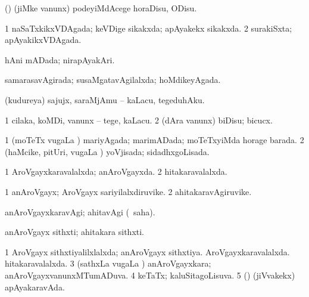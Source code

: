 \bentry
{} 
\gl{\sakirx}
\expl{}
\bmng
(\birx) (jiMke \mo vanunx) podeyiMdAcege horaDisu, ODisu. 
\emng
\eentry

\bentry
{} 
\gl{\gu}
\expl{}
\bmng
\bnum
\num{1} naSaTxkikxVDAgada; keVDige sikakxda; apAyakekx sikakxda. 
\num{2} surakiSxta; apAyakikxVDAgada. 
\enum
\emng
\eentry

\bentry
{} 
\gl{\gu}
\expl{}
\bmng
hAni mADada; nirapAyakAri. 
\emng
\eentry

\bentry
{} 
\gl{\gu}
\expl{}
\bmng
samarasavAgirada; susaMgatavAgilalxda; hoMdikeyAgada. 
\emng
\eentry

\bentry
{} 
\gl{\sakirx}
\expl{}
\bmng
(kudureya) sajujx, saraMjAmu -- kaLacu, tegeduhAku. 
\emng
\eentry

\bentry
{} 
\gl{\sakirx}
\expl{}
\bmng
\bnum
\num{1} cilaka, koMDi, \mo vanunx -- tege, kaLacu. 
\num{2} (dAra \mo vanunx) biDisu; bicucx. 
\enum
\emng
\eentry

\bentry
{} 
\gl{\gu}
\expl{}
\bmng
\bnum
\num{1} (moTeTx \mo vugaLa \vi) mariyAgada; marimADada; moTeTxyiMda horage barada. 
\num{2} (haMcike, pitUri, \mo vugaLa \vi) yoVjisada; sidadhxgoLisada. 
\enum
\emng
\eentry

\bentry
{} 
\gl{\gu}
\expl{}
\bmng
\bnum
\num{1} AroVgayxkaravalalxda; anAroVgayxda. 
\num{2} hitakaravalalxda. 
\enum
\emng
\eentry

\bentry
{} 
\gl{\nA}
\expl{}
\bmng
\bnum
\num{1} anAroVgayx; AroVgayx sariyilalxdiruvike. 
\num{2} ahitakaravAgiruvike. 
\enum
\emng
\eentry

\bentry
{} 
\gl{\kirxvi}
\expl{}
\bmng
anAroVgayxkaravAgi; ahitavAgi (\rUpa\ saha). 
\emng
\eentry

\bentry
{} 
\gl{\nA}
\expl{}
\bmng
anAroVgayx sithxti; ahitakara sithxti. 
\emng
\eentry

\bentry
{} 
\gl{\gu}
\bmng
\bnum
\num{1} AroVgayx sithxtiyalilxlalxda; anAroVgayx sithxtiya. 
\banum
{} AroVgayxkaravalalxda. 
 hitakaravalalxda. 
\eanum
\numie
\num{3} (sathxLa \mo vugaLa \vi) anAroVgayxkara; anAroVgayxvanunxMTumADuva. 
\num{4} keTaTx; kaluSitagoLisuva. 
\num{5} (\ashi) (jiVvakekx) apAyakaravAda. 
\enum
\emng
\eentry

